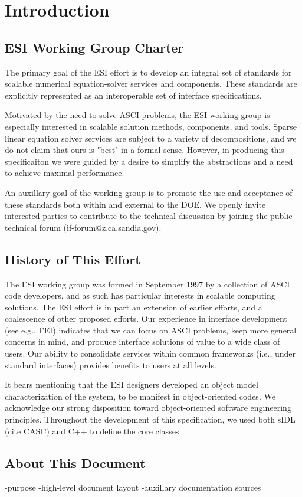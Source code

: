 \chapter{Introduction}

\section{ESI Working Group Charter}

	The primary goal of the ESI effort is to develop an integral set of 
standards for scalable numerical equation-solver services and 
components. These standards 
are explicitly represented as an interoperable set of  interface 
specifications. 

	Motivated by the need to solve ASCI problems, the ESI working group 
is especially interested in scalable solution methods, components, and 
tools. Sparse linear equation solver services are subject to a variety of 
decompositions, and we do not claim that ours is "best" in a formal 
sense.  However, in producing this specificaiton we were guided by a 
desire to simplify the abstractions and a need to achieve maximal 
performance. 

	An auxillary goal of the working group is to promote the use and 
acceptance of these standards both within and external to the DOE. We 
openly invite interested parties to contribute to the technical 
discussion by joining the public technical forum 
(if-forum@z.ca.sandia.gov). 

\section{History of This Effort}

	The ESI working group was formed in September 1997 by a collection of 
ASCI code developers, and as such has particular interests in 
scalable computing solutions. The ESI effort is in part an extension 
of earlier efforts, and a coalescence of other proposed efforts. Our 
experience in interface development (see e.g., FEI) indicates that we 
can focus on ASCI problems, keep more general concerns in mind, and 
produce interface solutions of value to a wide class of users.  Our 
ability to consolidate services within common frameworks (i.e., under 
standard interfaces) provides benefits to users at all levels. 

	It bears mentioning that the ESI designers developed an object 
model characterization of the system, to be manifest in 
object-oriented codes.  We acknowledge our strong disposition toward 
object-oriented software engineering principles.  Throughout the 
development of this specification, we used both sIDL (cite CASC) and
C++ to define the core classes.  

\section{About This Document}

-purpose
-high-level document layout
-auxillary documentation sources
